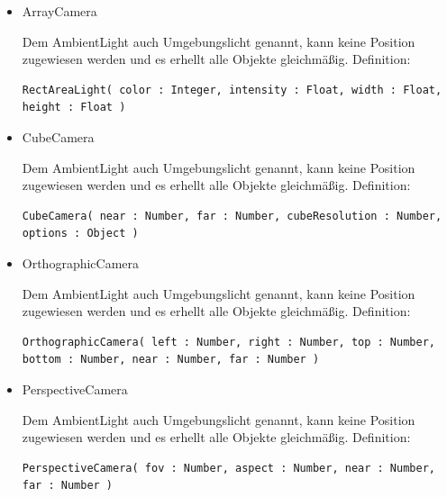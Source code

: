 \begin{itemize}
    \item ArrayCamera 
  
Dem AmbientLight auch Umgebungslicht genannt, kann keine Position zugewiesen werden und es erhellt alle Objekte gleichmäßig.
Definition:
\begin{verbatim}
RectAreaLight( color : Integer, intensity : Float, width : Float,
height : Float )
\end{verbatim}
    \item CubeCamera 
  
Dem AmbientLight auch Umgebungslicht genannt, kann keine Position zugewiesen werden und es erhellt alle Objekte gleichmäßig.
Definition:
\begin{verbatim}
CubeCamera( near : Number, far : Number, cubeResolution : Number,
options : Object )
\end{verbatim}
    \item OrthographicCamera 
  
Dem AmbientLight auch Umgebungslicht genannt, kann keine Position zugewiesen werden und es erhellt alle Objekte gleichmäßig.
Definition:
\begin{verbatim}
OrthographicCamera( left : Number, right : Number, top : Number,
bottom : Number, near : Number, far : Number )
\end{verbatim}
    \item PerspectiveCamera 
  
Dem AmbientLight auch Umgebungslicht genannt, kann keine Position zugewiesen werden und es erhellt alle Objekte gleichmäßig.
Definition:
\begin{verbatim}
PerspectiveCamera( fov : Number, aspect : Number, near : Number,
far : Number )
\end{verbatim}
\end{itemize}
\newpage
